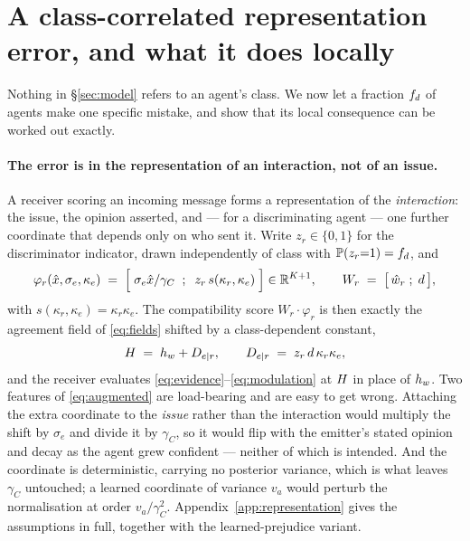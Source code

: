 \section{A class-correlated representation error, and what it does locally}
\label{sec:mechanism}

Nothing in \S\ref{sec:model} refers to an agent's class. We now let a fraction
$f_{d}$ of agents make one specific mistake, and show that its local consequence
can be worked out exactly.

\paragraph{The error is in the representation of an interaction, not of an issue.}
A receiver scoring an incoming message forms a representation of the
\emph{interaction}: the issue, the opinion asserted, and --- for a discriminating
agent --- one further coordinate that depends only on who sent it. Write
$z_r\in\{0,1\}$ for the discriminator indicator, drawn independently of class
with $\mathbb{P}(z_r{=}1)=f_{d}$, and
%
\begin{equation}
  \varphi_r(\hat{x},\sigma_e,\kappa_e) \;=\;
  \Bigl[\; \sigma_e\hat{x}/\gamma_C \;\;;\;\; z_r\,s(\kappa_r,\kappa_e) \;\Bigr]
  \in\mathbb{R}^{K+1},
  \qquad
  W_r \;=\; \bigl[\,\hat{w}_r \;;\; d\,\bigr],
  \label{eq:augmented}
\end{equation}
%
with $s(\kappa_r,\kappa_e)=\kappa_r\kappa_e$. The compatibility score
$W_r\cdot\varphi_r$ is then exactly the agreement field of \eqref{eq:fields}
shifted by a class-dependent constant,
%
\begin{equation}
  H \;=\; h_{w} + D_{e|r},
  \qquad
  D_{e|r} \;=\; z_r\,d\,\kappa_r\kappa_e ,
  \label{eq:disc-field}
\end{equation}
%
and the receiver evaluates \eqref{eq:evidence}--\eqref{eq:modulation} at $H$ in
place of $h_{w}$. Two features of \eqref{eq:augmented} are load-bearing and are
easy to get wrong. Attaching the extra coordinate to the \emph{issue} rather
than the interaction would multiply the shift by $\sigma_e$ and divide it by
$\gamma_C$, so it would flip with the emitter's stated opinion and decay as the
agent grew confident --- neither of which is intended. And the coordinate is
deterministic, carrying no posterior variance, which is what leaves $\gamma_C$
untouched; a learned coordinate of variance $v_a$ would perturb the
normalisation at order $v_a/\gamma_C^{2}$. Appendix~\ref{app:representation}
gives the assumptions in full, together with the learned-prejudice variant.

